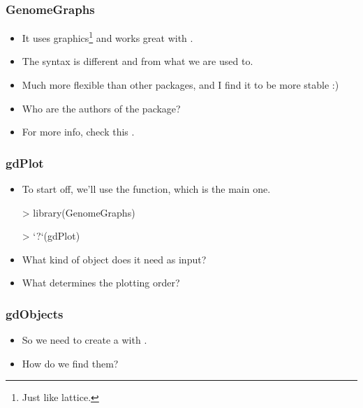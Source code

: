 \begin{frame}[allowframebreaks]
  \frametitle{GenomeGraphs}
  \begin{itemize}
  \item It uses  graphics\footnote{Just like lattice.} and works great with .
  \item The syntax is different and  from what we are used to.
  \item Much more flexible than other packages, and I find it to be more stable :)
  \item Who are the authors of the package?
  \item For more \alert{info}, check this .
  \end{itemize}
\end{frame}

\begin{frame}
  \frametitle{gdPlot}
  \begin{itemize}
  \item To start off, we'll use the  function, which is the main one.
\begin{Schunk}
\begin{Sinput}
> library(GenomeGraphs)
\end{Sinput}
\end{Schunk}
\begin{Schunk}
\begin{Sinput}
> `?`(gdPlot)
\end{Sinput}
\end{Schunk}
  \item What kind of object does it need as input?
  \item What determines the plotting order?
  \end{itemize}
\end{frame}

\begin{frame}[allowframebreaks]
  \frametitle{gdObjects}
  \begin{itemize}
  \item So we need to create a  with .
  \item How do we find them?
  \end{itemize}
\end{frame}

